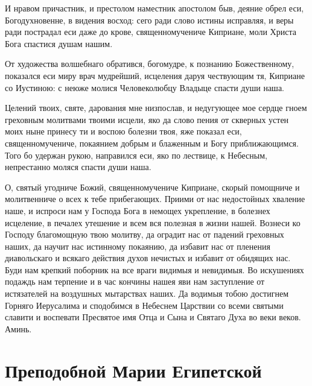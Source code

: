 \begin{mymulticols}



И нравом причастник, и престолом наместник апостолом быв, деяние обрел еси, Богодухновенне, в видения восход: сего ради слово истины исправляя, и веры ради пострадал еси даже до крове, священномучениче Киприане, моли Христа Бога спастися душам нашим.




От художества волшебнаго обратився, богомудре, к познанию Божественному, показался еси миру врач мудрейший, исцеления даруя чествующим тя, Киприане со Иустиною: с неюже молися Человеколюбцу Владыце спасти души наша.




Целений твоих, святе, дарования мне низпослав, и недугующее мое сердце гноем греховным молитвами твоими исцели, яко да слово пения от скверных устен моих ныне принесу ти и воспою болезни твоя, яже показал еси, священномучениче, покаянием добрым и блаженным и Богу приближающимся. Того бо удержан рукою, направился еси, яко по лествице, к Небесным, непрестанно моляся спасти души наша.




О, святый угодниче Божий, священномучениче Киприане, скорый помощниче и молитвенниче о всех к тебе прибегающих. Приими от нас недостойных хваление наше, и испроси нам у Господа Бога в немощех укрепление, в болезнех исцеление, в печалех утешение и всем вся полезная в жизни нашей. Вознеси ко Господу благомощную твою молитву, да оградит нас от падений греховных наших, да научит нас истинному покаянию, да избавит нас от пленения диавольскаго и всякаго действия духов нечистых и избавит от обидящих нас. Буди нам крепкий поборник на все враги видимыя и невидимыя. Во искушениях подаждь нам терпение и в час кончины нашея яви нам заступление от истязателей на воздушных мытарствах наших. Да водимыя тобою достигнем Горняго Иерусалима и сподобимся в Небеснем Царствии со всеми святыми славити и воспевати Пресвятое имя Отца и Сына и Святаго Духа во веки веков. Аминь.


\end{mymulticols}

\section{Преподобной Марии Египетской}


